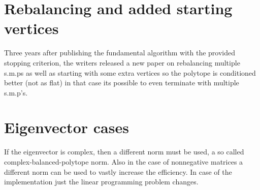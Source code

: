 \section{Rebalancing and added starting vertices}
Three years after publishing the fundamental algorithm with the provided stopping criterion, the writers released a new paper on rebalancing multiple s.m.ps as well as starting with some extra vertices so the polytope is conditioned better (not as flat) \citep{guglielmiInvariantPolytopesLinear2015} in that case its possible to even terminate with multiple s.m.p's.

\section{Eigenvector cases}
If the eigenvector is complex, then a different norm must be used, a so called complex-balanced-polytope norm. 
Also in the case of nonnegative matrices a different norm can be used to vastly increase the efficiency. 
In case of the implementation just the linear programming problem changes. 


